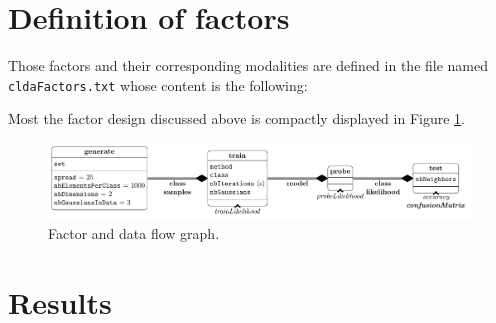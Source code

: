 \documentclass[12pt,a4paper,fleqn]{tufte-handout}
\begin{document}


\section{Definition of factors}  


Those factors and their corresponding modalities are defined in the file named \texttt{cldaFactors.txt} whose content is the following:


 Most the factor design discussed above is compactly displayed in Figure \ref{factorFlowGraph}.

\begin{figure}
\includegraphics[width=\textwidth]{figures/factors}
\caption{Factor and data flow graph.}
\label{factorFlowGraph}
\end{figure}

\section{Results}
  
  
  
 
 
  
\end{document}
